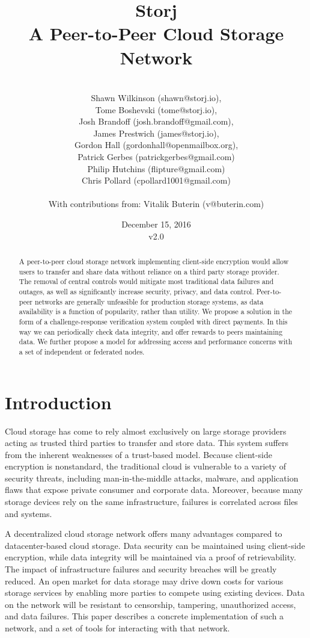 \documentclass[a4paper,10pt]{article}
\title{\textbf{Storj\\A Peer-to-Peer Cloud Storage Network}}
\author{\\
Shawn Wilkinson (shawn@storj.io),\\
Tome Boshevski (tome@storj.io),\\
Josh Brandoff (josh.brandoff@gmail.com),\\
James Prestwich (james@storj.io),\\
Gordon Hall (gordonhall@openmailbox.org),\\
Patrick Gerbes (patrickgerbes@gmail.com)\\
Philip Hutchins (flipture@gmail.com)\\
Chris Pollard (cpollard1001@gmail.com)\\
\\
With contributions from: Vitalik Buterin (v@buterin.com)
}
\date {December 15, 2016 \\ v2.0}
\begin{document}
\maketitle
\begin{abstract}
A peer-to-peer cloud storage network implementing client-side encryption would allow users to transfer and share data without reliance on a third party storage provider. The removal of central controls would mitigate most traditional data failures and outages, as well as significantly increase security, privacy, and data control. Peer-to-peer networks are generally unfeasible for production storage systems, as data availability is a function of popularity, rather than utility. We propose a solution in the form of a challenge-response verification system coupled with direct payments. In this way we can periodically check data integrity, and offer rewards to peers maintaining data. We further propose a model for addressing access and performance concerns with a set of independent or federated nodes.
\end{abstract}


\section{Introduction}
Cloud storage has come to rely almost exclusively on large storage providers acting as trusted third parties to transfer and store data. This system suffers from the inherent weaknesses of a trust-based model. Because client-side encryption is nonstandard, the traditional cloud is vulnerable to a variety of security threats, including man-in-the-middle attacks, malware, and application flaws that expose private consumer and corporate data. Moreover, because many storage devices rely on the same infrastructure, failures is correlated across files and systems.

A decentralized cloud storage network offers many advantages compared to datacenter-based cloud storage. Data security can be maintained using client-side encryption, while data integrity will be maintained via a proof of retrievability. The impact of infrastructure failures and security breaches will be greatly reduced. An open market for data storage may drive down costs for various storage services by enabling more parties to compete using existing devices. Data on the network will be resistant to censorship, tampering, unauthorized access, and data failures. This paper describes a concrete implementation of such a network, and a set of tools for interacting with that network.
\end{document}
